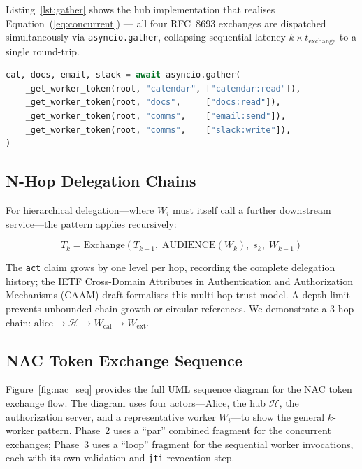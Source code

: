 \documentclass[journal]{IEEEtran}
\begin{document}
Listing~\ref{lst:gather} shows the hub implementation that realises
Equation~(\ref{eq:concurrent}) — all four RFC~8693 exchanges are dispatched
simultaneously via \texttt{asyncio.gather}, collapsing sequential latency
$k \times t_{\mathrm{exchange}}$ to a single round-trip.

\begin{lstlisting}[language=Python, label=lst:gather,
  caption={Concurrent RFC 8693 exchange (\texttt{assistant\_server.py});
  all four tokens are issued in parallel, achieving $O(1)$ wall-clock overhead.}]
cal, docs, email, slack = await asyncio.gather(
    _get_worker_token(root, "calendar", ["calendar:read"]),
    _get_worker_token(root, "docs",     ["docs:read"]),
    _get_worker_token(root, "comms",    ["email:send"]),
    _get_worker_token(root, "comms",    ["slack:write"]),
)
\end{lstlisting}

\subsection{N-Hop Delegation Chains}

For hierarchical delegation---where $W_i$ must itself call a further downstream
service---the pattern applies recursively:

\begin{equation}
T_k = \mathrm{Exchange}(T_{k-1},\;
  \mathrm{AUDIENCE}(W_k),\; s_k,\; W_{k-1})
\label{eq:nhop}
\end{equation}

The \texttt{act} claim grows by one level per hop, recording the complete
delegation history; the IETF Cross-Domain Attributes in Authentication and
Authorization Mechanisms (CAAM) draft \cite{ietf_caam} formalises this
multi-hop trust model. A depth limit prevents unbounded chain growth or
circular references. We demonstrate a 3-hop chain:
$\text{alice} \to \mathcal{H} \to W_{\mathrm{cal}} \to W_{\mathrm{ext}}$.

\subsection{NAC Token Exchange Sequence}

Figure~\ref{fig:nac_seq} provides the full UML sequence diagram for the NAC
token exchange flow. The diagram uses four actors---Alice, the hub
$\mathcal{H}$, the authorization server, and a representative worker
$W_i$---to show the general $k$-worker pattern. Phase~2 uses a ``par''
combined fragment for the concurrent exchanges; Phase~3 uses a ``loop''
fragment for the sequential worker invocations, each with its own
validation and \texttt{jti} revocation step.
\end{document}
